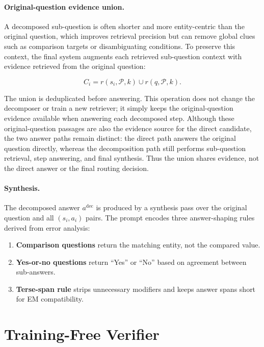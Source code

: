 \documentclass{nthu_thesis}
\begin{document}
\begin{thesiscjk}
\paragraph{Original-question evidence union.}
A decomposed sub-question is often shorter and more entity-centric than the original question, which improves retrieval precision but can remove global clues such as comparison targets or disambiguating conditions. To preserve this context, the final system augments each retrieved sub-question context with evidence retrieved from the original question:

\begin{equation}
    C_i = r(s_i, \mathcal{P}, k) \cup r(q, \mathcal{P}, k).
    \label{eq:evidence-union}
\end{equation}

The union is deduplicated before answering. This operation does not change the decomposer or train a new retriever; it simply keeps the original-question evidence available when answering each decomposed step. Although these original-question passages are also the evidence source for the direct candidate, the two answer paths remain distinct: the direct path answers the original question directly, whereas the decomposition path still performs sub-question retrieval, step answering, and final synthesis. Thus the union shares evidence, not the direct answer or the final routing decision.

\paragraph{Synthesis.}
The decomposed answer $a^{\mathrm{dec}}$ is produced by a synthesis pass over the original question and all $(s_i,a_i)$ pairs. The prompt encodes three answer-shaping rules derived from error analysis:

\begin{enumerate}
    \item \textbf{Comparison questions} return the matching entity, not the compared value.
    \item \textbf{Yes-or-no questions} return ``Yes'' or ``No'' based on agreement between sub-answers.
    \item \textbf{Terse-span rule} strips unnecessary modifiers and keeps answer spans short for EM compatibility.
\end{enumerate}

\section{Training-Free Verifier}
\label{sec:verifier}


\end{thesiscjk}
\end{document}
